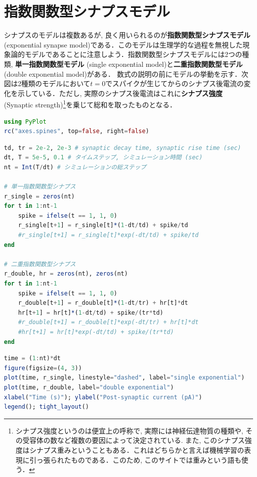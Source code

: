 \section{指数関数型シナプスモデル}
シナプスのモデルは複数あるが, 良く用いられるのが\textbf{指数関数型シナプスモデル}(exponential synapse model)である．このモデルは生理学的な過程を無視した現象論的モデルであることに注意しよう．指数関数型シナプスモデルには2つの種類, \textbf{単一指数関数型モデル} (single exponential model)と\textbf{二重指数関数型モデル} (double exponential model)がある．
数式の説明の前にモデルの挙動を示す．次図は2種類のモデルにおいて$t=0$でスパイクが生じてからのシナプス後電流の変化を示している．ただし, 実際のシナプス後電流はこれに\textbf{シナプス強度} (Synaptic strength)\footnote{シナプス強度というのは便宜上の呼称で, 実際には神経伝達物質の種類や, その受容体の数など複数の要因によって決定されている. また, このシナプス強度はシナプス重みということもある．これはどちらかと言えば機械学習の表現に引っ張られたものである．このため, このサイトでは重みという語も使う．}を乗じて総和を取ったものとなる．
\begin{lstlisting}[language=julia]
using PyPlot
rc("axes.spines", top=false, right=false)
\end{lstlisting}
\begin{lstlisting}[language=julia]
td, tr = 2e-2, 2e-3 # synaptic decay time, synaptic rise time (sec)
dt, T = 5e-5, 0.1 # タイムステップ, シミュレーション時間 (sec)
nt = Int(T/dt) # シミュレーションの総ステップ

# 単一指数関数型シナプス
r_single = zeros(nt)
for t in 1:nt-1
    spike = ifelse(t == 1, 1, 0)
    r_single[t+1] = r_single[t]*(1-dt/td) + spike/td
    #r_single[t+1] = r_single[t]*exp(-dt/td) + spike/td
end

# 二重指数関数型シナプス
r_double, hr = zeros(nt), zeros(nt)
for t in 1:nt-1
    spike = ifelse(t == 1, 1, 0)
    r_double[t+1] = r_double[t]*(1-dt/tr) + hr[t]*dt
    hr[t+1] = hr[t]*(1-dt/td) + spike/(tr*td)
    #r_double[t+1] = r_double[t]*exp(-dt/tr) + hr[t]*dt
    #hr[t+1] = hr[t]*exp(-dt/td) + spike/(tr*td)
end   
\end{lstlisting}
\begin{lstlisting}[language=julia]
time = (1:nt)*dt
figure(figsize=(4, 3))
plot(time, r_single, linestyle="dashed", label="single exponential")
plot(time, r_double, label="double exponential")
xlabel("Time (s)"); ylabel("Post-synaptic current (pA)")
legend(); tight_layout()
\end{lstlisting}
